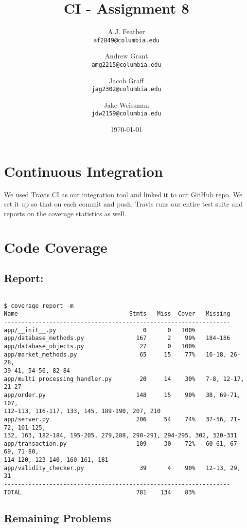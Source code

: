 \documentclass{article}
\author{
    A.J. Feather\\
    \texttt{af2849@columbia.edu}
    \and
    Andrew Grant\\
    \texttt{amg2215@columbia.edu}
    \and
    Jacob Graff\\
    \texttt{jag2302@columbia.edu}
    \and
    Jake Weissman\\
    \texttt{jdw2159@columbia.edu}
}
\date{\today}
\begin{document}
\title{CI - Assignment 8}
\maketitle

\section{Continuous Integration}
We used Travis CI as our integration tool and linked it to our GitHub repo. We set it up so that on each commit and push, Travis runs our entire test suite and reports on the coverage statistics as well.

\section{Code Coverage}

\subsection{Report:}

\begin{verbatim}

$ coverage report -m
Name                                Stmts   Miss  Cover   Missing
-----------------------------------------------------------------
app/__init__.py                         0      0   100%
app/database_methods.py               167      2    99%   184-186
app/database_objects.py                27      0   100%
app/market_methods.py                  65     15    77%   16-18, 26-28,
39-41, 54-56, 82-84
app/multi_processing_handler.py        20     14    30%   7-8, 12-17, 21-27
app/order.py                          148     15    90%   38, 69-71, 107,
112-113, 116-117, 133, 145, 189-190, 207, 210
app/server.py                         206     54    74%   37-56, 71-72, 101-125,
132, 163, 182-184, 195-205, 279,288, 290-291, 294-295, 302, 320-331
app/transaction.py                    109     30    72%   60-61, 67-69, 71-80,
114-120, 123-140, 160-161, 181
app/validity_checker.py                39      4    90%   12-13, 29, 31
-----------------------------------------------------------------
TOTAL                                 781    134    83%

\end{verbatim}

\subsection{Remaining Problems}
\end{document}
